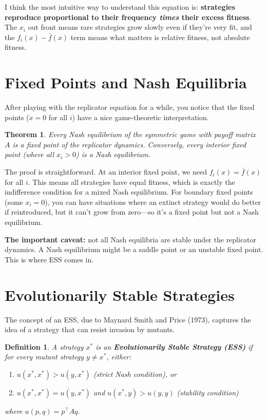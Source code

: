 \documentclass[11pt]{article}
\newtheorem{theorem}{Theorem}
\newtheorem{definition}{Definition}
\begin{document}
I think the most intuitive way to understand this equation is: \textbf{strategies reproduce proportional to their frequency \textit{times} their excess fitness}. The $x_i$ out front means rare strategies grow slowly even if they're very fit, and the $f_i(x) - \bar{f}(x)$ term means what matters is relative fitness, not absolute fitness.

\section{Fixed Points and Nash Equilibria}

After playing with the replicator equation for a while, you notice that the fixed points ($\dot{x} = 0$ for all $i$) have a nice game-theoretic interpretation.

\begin{theorem}
Every Nash equilibrium of the symmetric game with payoff matrix $A$ is a fixed point of the replicator dynamics. Conversely, every interior fixed point (where all $x_i > 0$) is a Nash equilibrium.
\end{theorem}

The proof is straightforward. At an interior fixed point, we need $f_i(x) = \bar{f}(x)$ for all $i$. This means all strategies have equal fitness, which is exactly the indifference condition for a mixed Nash equilibrium. For boundary fixed points (some $x_i = 0$), you can have situations where an extinct strategy would do better if reintroduced, but it can't grow from zero---so it's a fixed point but not a Nash equilibrium.

\textbf{The important caveat:} not all Nash equilibria are stable under the replicator dynamics. A Nash equilibrium might be a saddle point or an unstable fixed point. This is where ESS comes in.

\section{Evolutionarily Stable Strategies}

The concept of an ESS, due to Maynard Smith and Price (1973), captures the idea of a strategy that can resist invasion by mutants.

\begin{definition}
A strategy $x^*$ is an \textbf{Evolutionarily Stable Strategy (ESS)} if for every mutant strategy $y \neq x^*$, either:
\begin{enumerate}
    \item $u(x^*, x^*) > u(y, x^*)$ \quad (strict Nash condition), or
    \item $u(x^*, x^*) = u(y, x^*)$ and $u(x^*, y) > u(y, y)$ \quad (stability condition)
\end{enumerate}
where $u(p, q) = p^\top A q$.
\end{definition}
\end{document}
